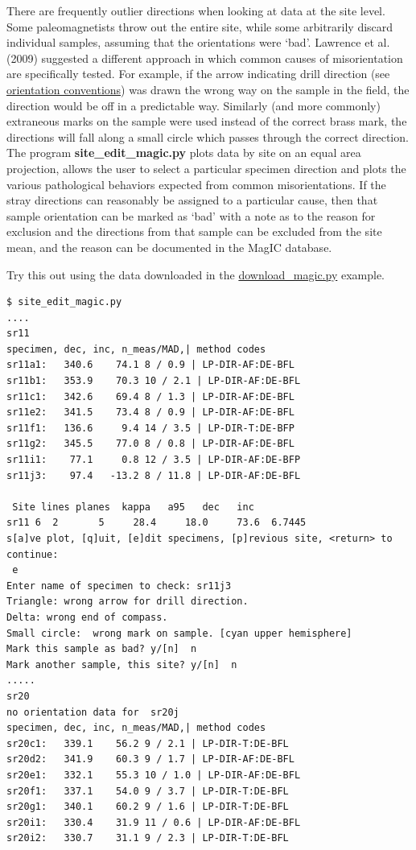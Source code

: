 \documentclass[11pt]{book}
\begin{document}
{{{There are frequently outlier directions when looking at data at the site level.  Some paleomagnetists throw out the entire site, while some arbitrarily discard individual samples, assuming that the orientations were `bad'.  Lawrence et al. (2009) \nocite{lawrence09} suggested a different approach in which common causes of misorientation are specifically tested.  For example, if the arrow indicating drill direction (see \href{#orientiation\_magic.py}{orientation conventions}) was drawn the wrong way on the sample in the field, the direction would be off in a predictable way.  Similarly (and more commonly) extraneous marks on the sample were used instead of the correct brass mark, the directions will fall along a small circle which passes through the correct direction.  The program {\bf site\_edit\_magic.py} plots data by site on an equal area projection, allows the user to select a particular specimen direction and plots the various pathological behaviors expected from common misorientations.  If the stray directions can reasonably be assigned to a particular cause, then that sample orientation can be marked as `bad' with a note as to the reason for exclusion and the directions from that sample can be excluded from the site mean, and the reason can be documented in the MagIC database.

Try this out using the data downloaded  in the \href{#download_magic.py}{download\_magic.py} example.

\begin{verbatim}
$ site_edit_magic.py
....
sr11
specimen, dec, inc, n_meas/MAD,| method codes
sr11a1:   340.6    74.1 8 / 0.9 | LP-DIR-AF:DE-BFL
sr11b1:   353.9    70.3 10 / 2.1 | LP-DIR-AF:DE-BFL
sr11c1:   342.6    69.4 8 / 1.3 | LP-DIR-AF:DE-BFL
sr11e2:   341.5    73.4 8 / 0.9 | LP-DIR-AF:DE-BFL
sr11f1:   136.6     9.4 14 / 3.5 | LP-DIR-T:DE-BFP
sr11g2:   345.5    77.0 8 / 0.8 | LP-DIR-AF:DE-BFL
sr11i1:    77.1     0.8 12 / 3.5 | LP-DIR-AF:DE-BFP
sr11j3:    97.4   -13.2 8 / 11.8 | LP-DIR-AF:DE-BFL

 Site lines planes  kappa   a95   dec   inc
sr11 6  2       5     28.4     18.0     73.6  6.7445
s[a]ve plot, [q]uit, [e]dit specimens, [p]revious site, <return> to continue:
 e
Enter name of specimen to check: sr11j3
Triangle: wrong arrow for drill direction.
Delta: wrong end of compass.
Small circle:  wrong mark on sample. [cyan upper hemisphere]
Mark this sample as bad? y/[n]  n
Mark another sample, this site? y/[n]  n
.....
sr20
no orientation data for  sr20j
specimen, dec, inc, n_meas/MAD,| method codes
sr20c1:   339.1    56.2 9 / 2.1 | LP-DIR-T:DE-BFL
sr20d2:   341.9    60.3 9 / 1.7 | LP-DIR-AF:DE-BFL
sr20e1:   332.1    55.3 10 / 1.0 | LP-DIR-AF:DE-BFL
sr20f1:   337.1    54.0 9 / 3.7 | LP-DIR-T:DE-BFL
sr20g1:   340.1    60.2 9 / 1.6 | LP-DIR-T:DE-BFL
sr20i1:   330.4    31.9 11 / 0.6 | LP-DIR-AF:DE-BFL
sr20i2:   330.7    31.1 9 / 2.3 | LP-DIR-T:DE-BFL


\end{verbatim}}}}
\end{document}
